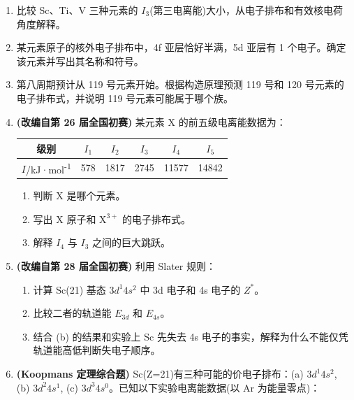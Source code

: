 \documentclass[a4paper,11pt]{ctexart}
\providecommand{\tightlist}{\setlength{\itemsep}{0pt}\setlength{\parskip}{0pt}}
\newcounter{none}
\newcommand{\箭}{\ensuremath{\rightarrow}}
\newcommand{\左箭}{\ensuremath{\leftarrow}}
\newcommand{\上箭}{\ensuremath{\uparrow}}
\newcommand{\下箭}{\ensuremath{\downarrow}}
\newcommand{\衡}{\ensuremath{\rightleftharpoons}}
\newcommand{\双箭}{\ensuremath{\leftrightarrow}}
\newcommand{\约等于}{\ensuremath{\approx}}
\newcommand{\小于等于}{\ensuremath{\leq}}
\newcommand{\大于等于}{\ensuremath{\geq}}
\newcommand{\不等于}{\ensuremath{\neq}}
\newcommand{\西格马}{\ensuremath{\sigma}}
\newcommand{\派}{\ensuremath{\pi}}
\begin{document}
\begin{enumerate}
\def\labelenumi{\arabic{enumi}.}
\setcounter{enumi}{19}
\item
  比较 Sc、Ti、V 三种元素的 \(I_3\)(第三电离能)大小，从电子排布和有效核电荷角度解释。
\item
  某元素原子的核外电子排布中，4f 亚层恰好半满，5d 亚层有 1 个电子。确定该元素并写出其名称和符号。
\item
  第八周期预计从 119 号元素开始。根据构造原理预测 119 号和 120 号元素的电子排布式，并说明 119 号元素可能属于哪个族。
\item
  \textbf{(改编自第 26 届全国初赛)} 某元素 X 的前五级电离能数据为：

  {\def\LTcaptype{none} %
  \begin{longtable}[]{@{}cccccc@{}}
  \toprule\noalign{}
  级别 & \(I_1\) & \(I_2\) & \(I_3\) & \(I_4\) & \(I_5\) \\
  \midrule\noalign{}
  \endhead
  \bottomrule\noalign{}
  \endlastfoot
  \(I\)/kJ·mol\textsuperscript{-1} & 578 & 1817 & 2745 & 11577 & 14842 \\
  \end{longtable}
  }

  \begin{enumerate}
  \def\labelenumii{(\alph{enumii})}
  \tightlist
  \item
    判断 X 是哪个元素。
  \item
    写出 X 原子和 \(\mathrm{X^{3+}}\) 的电子排布式。
  \item
    解释 \(I_4\) 与 \(I_3\) 之间的巨大跳跃。
  \end{enumerate}
\item
  \textbf{(改编自第 28 届全国初赛)} 利用 Slater 规则：

  \begin{enumerate}
  \def\labelenumii{(\alph{enumii})}
  \tightlist
  \item
    计算 Sc(21) 基态 \(3d^1 4s^2\) 中 3d 电子和 4s 电子的 \(Z^*\)。
  \item
    比较二者的轨道能 \(E_{3d}\) 和 \(E_{4s}\)。
  \item
    结合 (b) 的结果和实验上 Sc 先失去 4s 电子的事实，解释为什么不能仅凭轨道能高低判断失电子顺序。
  \end{enumerate}
\item
  \textbf{(Koopmans 定理综合题)} Sc(Z=21)有三种可能的价电子排布：(a) \(3d^1 4s^2\), (b) \(3d^2 4s^1\), (c) \(3d^3 4s^0\)。已知以下实验电离能数据(以 Ar 为能量零点)：


\end{enumerate}
\end{document}
